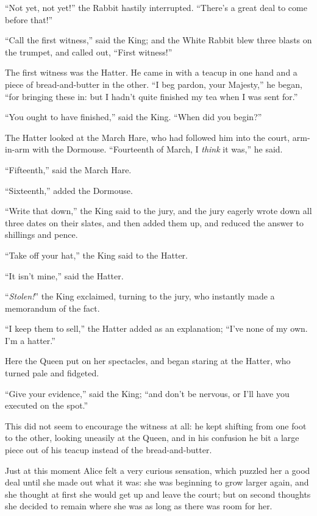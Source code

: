 \documentclass[11pt,openany,oneside]{book}
\begin{document}
“Not yet, not yet!” the Rabbit hastily interrupted. “There’s a great deal to come before that!” 

“Call the first witness,” said the King; and the White Rabbit blew three blasts on the trumpet, and called out, “First witness!” 

The first witness was the Hatter. He came in with a teacup in one hand and a piece of bread-and-butter in the other. “I beg pardon, your Majesty,” he began, “for bringing these in: but I hadn’t quite finished my tea when I was sent for.” 

“You ought to have finished,” said the King. “When did you begin?” 

The Hatter looked at the March Hare, who had followed him into the court, arm-in-arm with the Dormouse. “Fourteenth of March, I {\em think\/} it was,” he said. 

“Fifteenth,” said the March Hare. 

“Sixteenth,” added the Dormouse. 

“Write that down,” the King said to the jury, and the jury eagerly wrote down all three dates on their slates, and then added them up, and reduced the answer to shillings and pence. 

“Take off your hat,” the King said to the Hatter. 

“It isn’t mine,” said the Hatter. 

“{\em Stolen!\/}” the King exclaimed, turning to the jury, who instantly made a memorandum of the fact. 

“I keep them to sell,” the Hatter added as an explanation; “I’ve none of my own. I’m a hatter.” 

Here the Queen put on her spectacles, and began staring at the Hatter, who turned pale and fidgeted. 

“Give your evidence,” said the King; “and don’t be nervous, or I’ll have you executed on the spot.” 

This did not seem to encourage the witness at all: he kept shifting from one foot to the other, looking uneasily at the Queen, and in his confusion he bit a large piece out of his teacup instead of the bread-and-butter. 

Just at this moment Alice felt a very curious sensation, which puzzled her a good deal until she made out what it was: she was beginning to grow larger again, and she thought at first she would get up and leave the court; but on second thoughts she decided to remain where she was as long as there was room for her. 
\end{document}
